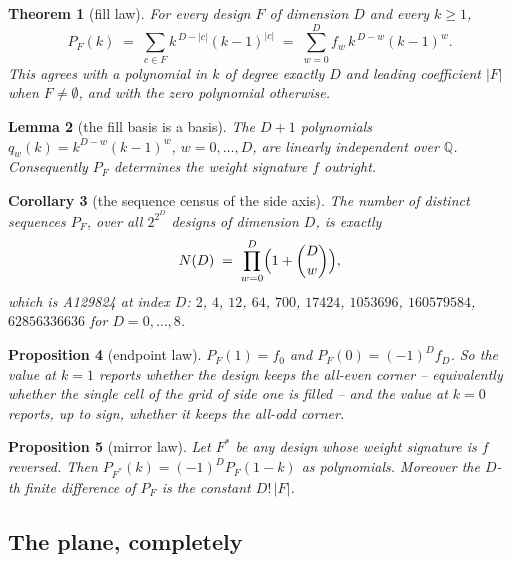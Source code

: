 \documentclass[11pt]{amsart}
\newtheorem{theorem}{Theorem}[section]
\newtheorem{proposition}[theorem]{Proposition}
\newtheorem{lemma}[theorem]{Lemma}
\newtheorem{corollary}[theorem]{Corollary}
\theoremstyle{definition}
\theoremstyle{remark}
\begin{document}
\begin{theorem}[fill law]
\label{thm:fill}
For every design $F$ of dimension $D$ and every $k \ge 1$,
\[
  P_{F}(k) \;=\; \sum_{c \in F} k^{\,D-|c|}(k-1)^{|c|} \;=\; \sum_{w=0}^{D} f_{w}\,k^{\,D-w}(k-1)^{w}.
\]
This agrees with a polynomial in $k$ of degree exactly $D$ and leading coefficient $|F|$ when $F \neq \emptyset$, and with the zero polynomial otherwise.
\end{theorem}

\begin{lemma}[the fill basis is a basis]
\label{lem:basis}
The $D+1$ polynomials $q_{w}(k) = k^{D-w}(k-1)^{w}$, $w = 0,\dots,D$, are linearly independent over $\mathbb{Q}$. Consequently $P_{F}$ determines the weight signature $f$ outright.
\end{lemma}

\begin{corollary}[the sequence census of the side axis]
\label{cor:census}
The number of distinct sequences $P_{F}$, over all $2^{2^{D}}$ designs of dimension $D$, is exactly
\[
  N(D) \;=\; \prod_{w=0}^{D}\Bigl(1+\binom{D}{w}\Bigr),
\]
which is A129824 at index $D$: $2$, $4$, $12$, $64$, $700$, $17424$, $1053696$, $160579584$, $62856336636$ for $D = 0,\dots,8$.
\end{corollary}

\begin{proposition}[endpoint law]
\label{prop:endpoints}
$P_{F}(1) = f_{0}$ and $P_{F}(0) = (-1)^{D}f_{D}$. So the value at $k=1$ reports whether the design keeps the all-even corner -- equivalently whether the single cell of the grid of side one is filled -- and the value at $k=0$ reports, up to sign, whether it keeps the all-odd corner.
\end{proposition}

\begin{proposition}[mirror law]
\label{prop:mirror}
Let $F^{\ast}$ be any design whose weight signature is $f$ reversed. Then $P_{F^{\ast}}(k) = (-1)^{D}P_{F}(1-k)$ as polynomials. Moreover the $D$-th finite difference of $P_{F}$ is the constant $D!\,|F|$.
\end{proposition}

\subsection*{The plane, completely}
\end{document}

